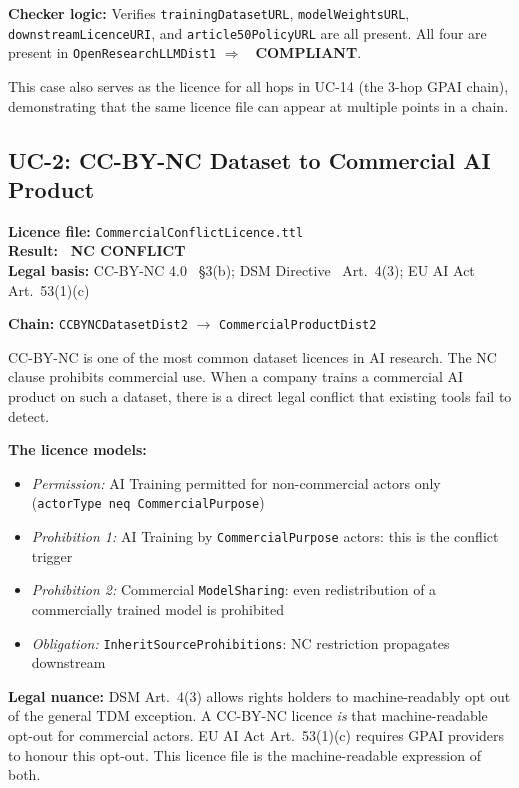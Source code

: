 \documentclass[12pt,a4paper]{article}
\newcommand{\compliant}{\textcolor{compliant}{\textbf{\checkmark\ COMPLIANT}}}
\newcommand{\violated}[1]{\textcolor{violation}{\textbf{\texttimes\ #1}}}
\begin{document}
\textbf{Checker logic:} Verifies \texttt{trainingDatasetURL}, \texttt{modelWeightsURL}, \texttt{downstreamLicenceURI}, and \texttt{article50PolicyURL} are all present. All four are present in \texttt{OpenResearchLLMDist1} $\Rightarrow$ \compliant.

This case also serves as the licence for all hops in UC-14 (the 3-hop GPAI chain), demonstrating that the same licence file can appear at multiple points in a chain.

\subsection{UC-2: CC-BY-NC Dataset to Commercial AI Product}
\textbf{Licence file:} \texttt{CommercialConflictLicence.ttl}\\[2pt]
\textbf{Result:} \violated{NC CONFLICT}\\[4pt]
\textbf{Legal basis:} CC-BY-NC 4.0~\cite{ccbync40} \S 3(b); DSM Directive~\cite{dsm2019} Art.\ 4(3); EU AI Act~\cite{euaiact2024} Art.\ 53(1)(c)

\textbf{Chain:} \texttt{CCBYNCDatasetDist2} $\rightarrow$ \texttt{CommercialProductDist2}

CC-BY-NC is one of the most common dataset licences in AI research. The NC clause prohibits commercial use. When a company trains a commercial AI product on such a dataset, there is a direct legal conflict that existing tools fail to detect.

\textbf{The licence models:}
\begin{itemize}[noitemsep]
  \item \emph{Permission:} AI Training permitted for non-commercial actors only (\texttt{actorType neq CommercialPurpose})
  \item \emph{Prohibition 1:} AI Training by \texttt{CommercialPurpose} actors: this is the conflict trigger
  \item \emph{Prohibition 2:} Commercial \texttt{ModelSharing}: even redistribution of a commercially trained model is prohibited
  \item \emph{Obligation:} \texttt{InheritSourceProhibitions}: NC restriction propagates downstream
\end{itemize}

\textbf{Legal nuance:} DSM Art.\ 4(3) allows rights holders to machine-readably opt out of the general TDM exception. A CC-BY-NC licence \emph{is} that machine-readable opt-out for commercial actors. EU AI Act Art.\ 53(1)(c) requires GPAI providers to honour this opt-out. This licence file is the machine-readable expression of both.
\end{document}
